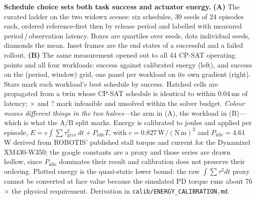 
\caption{\textbf{Schedule choice sets both task success and actuator energy.}
\textbf{(A)} The curated ladder on the two widowx scenes: six schedules,
30 seeds of 24 episodes each, ordered reference-first then by release period and
labelled with measured period\,/\,observation latency. Boxes are quartiles over
seeds, dots individual seeds, diamonds the mean. Inset frames are the end states
of a successful and a failed rollout. \textbf{(B)} The same measurement opened
out to all 44 CP-SAT operating points and all four workloads: success against
calibrated energy (left), and success on the (period, window) grid, one panel per
workload on its own gradient (right). Stars mark each workload's best schedule by
success. Hatched cells are propagated from a twin whose CP-SAT schedule is
identical to within 0.04\,ms of latency; $\times$ and ? mark infeasible and
unsolved within the solver budget. \emph{Colour means different things in the two
halves}---the arm in (A), the workload in (B)---which is what the A/B split
marks. Energy is calibrated to joules and applied per episode,
$E = c\int\!\sum\tau_{\mathrm{grav}}^2\,dt + P_{\mathrm{idle}}T$, with
$c=0.827\,\mathrm{W/(N\,m)^2}$ and $P_{\mathrm{idle}}=4.61$\,W derived from
ROBOTIS' published stall torque and current for the Dynamixel XM430-W350; the
google constants are a proxy and those series are drawn hollow, since
$P_{\mathrm{idle}}$ dominates their result and calibration does not preserve
their ordering. Plotted energy is the quasi-static lower bound: the raw
$\int\!\sum\tau^2dt$ proxy cannot be converted at face value because the
simulated PD torque runs about 76$\times$ the physical requirement. Derivation in
\texttt{calib/ENERGY\_CALIBRATION.md}.}
